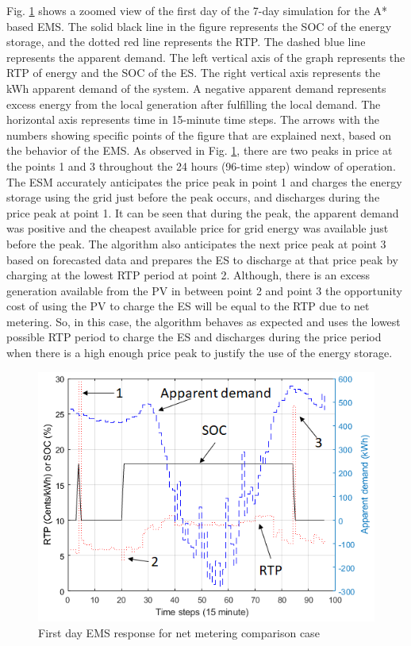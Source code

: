 Fig. \ref{fig:SBMPO_COMP_1_day} shows a zoomed view of the first day of the 7-day simulation for the A* based EMS. The solid black line in the figure represents the SOC of the energy storage, and the dotted red line represents the RTP. The dashed blue line represents the apparent demand. The left vertical axis of the graph represents the RTP of energy and the SOC of the ES. The right vertical axis represents the kWh apparent demand of the system. A negative apparent demand represents excess energy from the local generation after fulfilling the local demand. The horizontal axis represents time in 15-minute time steps. The arrows with the numbers showing specific points of the figure that are explained next, based on the behavior of the EMS. As observed in Fig. \ref{fig:SBMPO_COMP_1_day}, there are two peaks in price at the points 1 and 3 throughout the 24 hours (96-time step) window of operation.  The ESM accurately anticipates the price peak in point 1 and charges the energy storage using the grid just before the peak occurs, and discharges during the price peak at point 1. It can be seen that during the peak, the apparent demand was positive and the cheapest available price for grid energy was available just before the peak. The algorithm also anticipates the next price peak at point 3 based on forecasted data and prepares the ES to discharge at that price peak by charging at the lowest RTP period at point 2. Although, there is an excess generation available from the PV in between point 2 and point 3 the opportunity cost of using the PV to charge the ES will be equal to the RTP due to net metering. So, in this case, the algorithm behaves as expected and uses the lowest possible RTP period to charge the ES and discharges during the price period when there is a high enough price peak to justify the use of the energy storage.

\begin{figure}[!ht]
    \centering
    \includegraphics[width = \linewidth]{figs/SBMPO_COMP_1_day.png}
    \caption{First day EMS response for net metering comparison case}
    \label{fig:SBMPO_COMP_1_day}
\end{figure}

